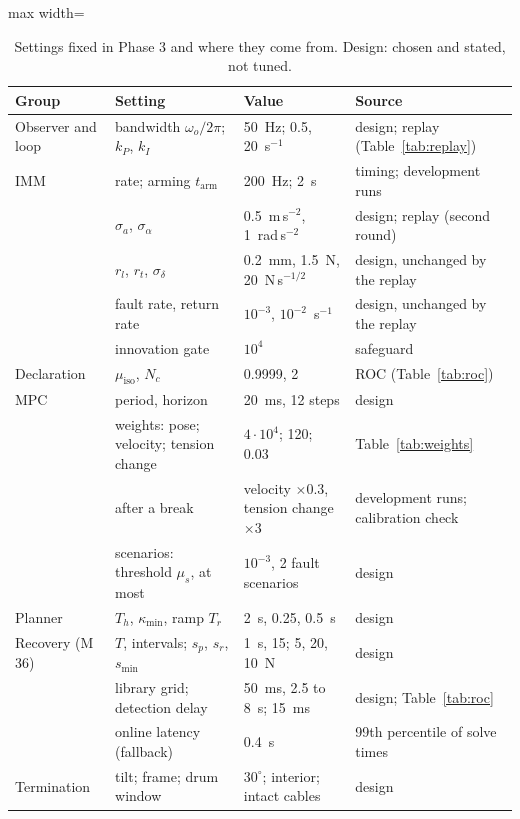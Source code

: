 \documentclass[10pt]{article}
\begin{document}
\begin{table}[h]
\centering\small
\caption{Settings fixed in Phase 3 and where they come from. Design: chosen and stated, not tuned.}\label{tab:settings}
\begin{adjustbox}{max width=\linewidth}\begin{tabular}{@{}llll@{}}
\toprule
Group & Setting & Value & Source \\
\midrule
Observer and loop & bandwidth $\omega_o/2\pi$; $k_P$, $k_I$ & 50~Hz; 0.5, 20~s$^{-1}$ & design; replay (Table~\ref{tab:replay}) \\
IMM & rate; arming $t_{\mathrm{arm}}$ & 200~Hz; 2~s & timing; development runs \\
 & $\sigma_a$, $\sigma_\alpha$ & 0.5~m\,s$^{-2}$, 1~rad\,s$^{-2}$ & design; replay (second round) \\
 & $r_l$, $r_t$, $\sigma_\delta$ & 0.2~mm, 1.5~N, 20~N\,s$^{-1/2}$ & design, unchanged by the replay \\
 & fault rate, return rate & $10^{-3}$, $10^{-2}$~s$^{-1}$ & design, unchanged by the replay \\
 & innovation gate & $10^4$ & safeguard \\
Declaration & $\mu_{\mathrm{iso}}$, $N_c$ & 0.9999, 2 & ROC (Table~\ref{tab:roc}) \\
MPC & period, horizon & 20~ms, 12 steps & design \\
 & weights: pose; velocity; tension change & $4\cdot10^4$; 120; 0.03 & Table~\ref{tab:weights} \\
 & after a break & velocity $\times0.3$, tension change $\times3$ & development runs; calibration check \\
 & scenarios: threshold $\mu_s$, at most & $10^{-3}$, 2 fault scenarios & design \\
Planner & $T_h$, $\kappa_{\min}$, ramp $T_r$ & 2~s, 0.25, 0.5~s & design \\
Recovery (M\,36) & $T$, intervals; $s_p$, $s_r$, $s_{\min}$ & 1~s, 15; 5, 20, 10~N & design \\
 & library grid; detection delay & 50~ms, 2.5 to 8~s; 15~ms & design; Table~\ref{tab:roc} \\
 & online latency (fallback) & 0.4~s & 99th percentile of solve times \\
Termination & tilt; frame; drum window & $30^\circ$; interior; intact cables & design \\
\bottomrule
\end{tabular}\end{adjustbox}
\end{table}
\end{document}
